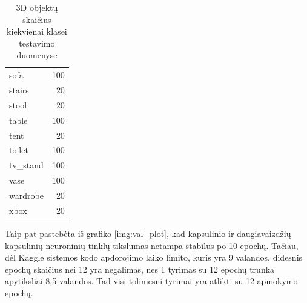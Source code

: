\begin{table}[]
\begin{tabular}{lr}
	sofa        &                   100 \\
	stairs      &                    20 \\
	stool       &                    20 \\
	table       &                   100 \\
	tent        &                    20 \\
	toilet      &                   100 \\
	tv\_stand    &                   100 \\
	vase        &                   100 \\
	wardrobe    &                    20 \\
	xbox        &                    20 \\
\end{tabular}
\caption{3D objektų skaičius kiekvienai klasei testavimo duomenyse}
\label{tbl:class_imbalance}
\end{table}


Taip pat pastebėta iš grafiko \ref{img:val_plot}, kad kapsulinio ir daugiavaizdžių kapsulinių neuroninių tinklų tikslumas netampa stabilus po 10 epochų. Tačiau, dėl Kaggle sistemos kodo apdorojimo laiko limito, kuris yra 9 valandos, didesnis epochų skaičius nei 12 yra negalimas, nes 1 tyrimas su 12 epochų trunka apytiksliai 8,5 valandos. Tad visi tolimesni tyrimai yra  atlikti su 12 apmokymo epochų.

